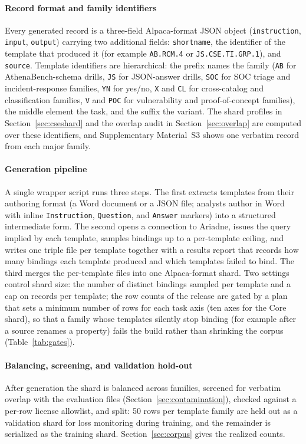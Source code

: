 \documentclass[a4paper,fleqn]{cas-dc}
\begin{document}
\paragraph{Record format and family identifiers}
Every generated record is a three-field Alpaca-format JSON object (\texttt{instruction}, \texttt{input}, \texttt{output}) carrying two additional fields: \texttt{shortname}, the identifier of the template that produced it (for example \texttt{AB.RCM.4} or \texttt{JS.CSE.TI.GRP.1}), and \texttt{source}. Template identifiers are hierarchical: the prefix names the family (\texttt{AB} for AthenaBench-schema drills, \texttt{JS} for JSON-answer drills, \texttt{SOC} for SOC triage and incident-response families, \texttt{YN} for yes/no, \texttt{X} and \texttt{CL} for cross-catalog and classification families, \texttt{V} and \texttt{POC} for vulnerability and proof-of-concept families), the middle element the task, and the suffix the variant. The shard profiles in Section~\ref{sec:cseshard} and the overlap audit in Section~\ref{sec:overlap} are computed over these identifiers, and Supplementary Material~S3 shows one verbatim record from each major family.

\paragraph{Generation pipeline}
A single wrapper script runs three steps. The first extracts templates from their authoring format (a Word document or a JSON file; analysts author in Word with inline \texttt{Instruction}, \texttt{Question}, and \texttt{Answer} markers) into a structured intermediate form. The second opens a connection to Ariadne, issues the query implied by each template, samples bindings up to a per-template ceiling, and writes one triple file per template together with a results report that records how many bindings each template produced and which templates failed to bind. The third merges the per-template files into one Alpaca-format shard. Two settings control shard size: the number of distinct bindings sampled per template and a cap on records per template; the row counts of the release are gated by a plan that sets a minimum number of rows for each task axis (ten axes for the Core shard), so that a family whose templates silently stop binding (for example after a source renames a property) fails the build rather than shrinking the corpus (Table~\ref{tab:gates}).

\paragraph{Balancing, screening, and validation hold-out}
After generation the shard is balanced across families, screened for verbatim overlap with the evaluation files (Section~\ref{sec:contamination}), checked against a per-row license allowlist, and split: 50 rows per template family are held out as a validation shard for loss monitoring during training, and the remainder is serialized as the training shard. Section~\ref{sec:corpus} gives the realized counts.
\end{document}

